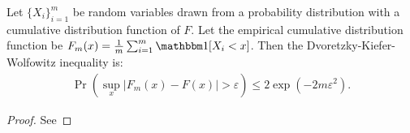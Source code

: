     

    \begin{theorem} \label{thrm:dkw_inequality}
        Let $\{X_i\}_{i=1}^m$ be random variables drawn from a probability distribution with a cumulative distribution function of $F$. Let the empirical cumulative distribution function be $F_m(x)=\frac{1}{m} \sum_{i=1}^m \one[X_i < x]$. Then the Dvoretzky-Kiefer-Wolfowitz inequality is:
        \begin{align}
            \Pr\left(\sup_x |F_m(x)-F(x)| > \varepsilon\right) \leq 2\exp\left(-2m\varepsilon^2\right).
        \end{align}
    \end{theorem}
    \begin{proof}
        See %
    \end{proof}







    

